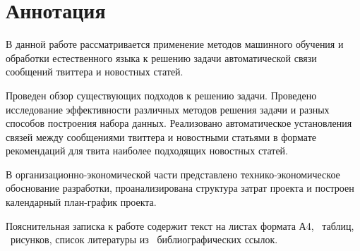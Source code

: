 \section*{Аннотация}

В данной работе рассматривается применение методов машинного обучения и обработки естественного языка к решению задачи автоматической связи сообщений твиттера и новостных статей.

Проведен обзор существующих подходов к решению задачи.
Проведено исследование эффективности различных методов решения задачи и разных способов построения набора данных.
Реализовано автоматическое установления связей между сообщениями твиттера и новостными статьями в формате рекомендаций для твита наиболее подходящих новостных статей.

В организационно-экономической части представлено технико-экономическое обоснование разработки, проанализирована структура затрат проекта и построен календарный план-график проекта.

Пояснительная записка к работе содержит текст на \pageref{LastPage} листах формата А4,  \totfig~таблиц, \tottab~рисунков, список литературы из \totbibref~библиографических ссылок.
